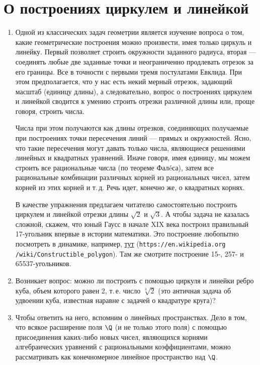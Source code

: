 \section{О построениях циркулем и линейкой}



\begin{enumerate}
\item Одной из классических задач геометрии является изучение вопроса о том, какие геометрические построения можно произвести, имея только циркуль и линейку. Первый позволяет строить окружности заданного радиуса, вторая --- соединять любые две заданные точки и неограниченно продлевать отрезок за его границы. Все в точности с первыми тремя постулатами Евклида. При этом предполагается, что у нас есть некий мерный отрезок, задающий масштаб (единицу длины), а следовательно, вопрос о построениях циркулем и линейкой сводится к умению строить отрезки различной длины или, проще говоря, строить числа.

Числа при этом получаются как длины отрезков, соединяющих получаемые при построениях точки пересечения линий --- прямых и окружностей. Ясно, что такие пересечения могут давать только числа, являющиеся решениями линейных и квадратных уравнений. Иначе говоря, имея единицу, мы можем строить все рациональные числа (по теореме Фал\'eса), затем все рациональные комбинации различных корней из рациональных чисел, затем корней из этих корней и т.\,д. Речь идет, конечно же, о квадратных корнях.

В качестве упражнения предлагаем читателю самостоятельно построить циркулем и линейкой отрезки длины $\sqrt 2$ и $\sqrt 3$. А чтобы задача не казалась сложной, скажем, что юный Гаусс в начале XIX века построил правильный 17-угольник впервые в истории математики. Это построение любопытно посмотреть в динамике, например, \href{https://en.wikipedia.org/wiki/Constructible_polygon}{тут} (\verb|https://en.wikipedia.org| \verb|/wiki/Constructible_polygon|). Там же смотрите построение 15-, 257- и 65537-угольников.

\item Возникает вопрос: можно ли построить с помощью циркуля и линейки ребро куба, объем которого равен 2, т.\,е. число $\sqrt[3]{2}$ (это  античная задача об удвоении куба, известная наравне с задачей о квадратуре круга)?

\item Чтобы ответить на него, вспомним о линейных пространствах. Дело в том, что всякое расширение поля $\Q$ (и не только этого поля) с помощью присоединения каких-либо новых чисел, являющихся корнями алгебраических уравнений с рациональными коэффициентами, можно рассматривать как конечномерное линейное пространство над $\Q$.


\end{enumerate}
